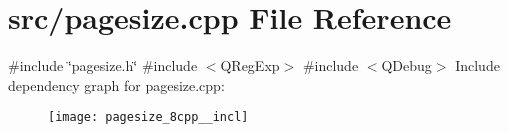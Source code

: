 \section{src/pagesize.cpp File Reference}
\label{pagesize_8cpp}
{\ttfamily \#include \char`\"{}pagesize.\+h\char`\"{}}\newline
{\ttfamily \#include $<$Q\+Reg\+Exp$>$}\newline
{\ttfamily \#include $<$Q\+Debug$>$}\newline
Include dependency graph for pagesize.\+cpp\+:\nopagebreak
\begin{figure}[H]
\begin{center}
\leavevmode
\texttt{[image: pagesize\_8cpp\_\_incl]}
\end{center}
\end{figure}
